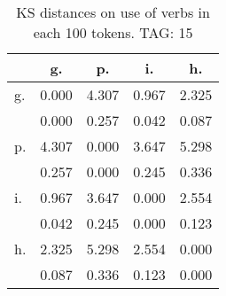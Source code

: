 \begin{table}[h!]
\begin{center}
\begin{tabular}{| l | c | c | c | c |}\hline
 & g. & p. & i. & h. \\\hline
g. & 0.000  & 4.307  & 0.967  & 2.325 \\\hline
 & 0.000  & 0.257  & 0.042  & 0.087 \\\hline
p. & 4.307  & 0.000  & 3.647  & 5.298 \\\hline
 & 0.257  & 0.000  & 0.245  & 0.336 \\\hline
i. & 0.967  & 3.647  & 0.000  & 2.554 \\\hline
 & 0.042  & 0.245  & 0.000  & 0.123 \\\hline
h. & 2.325  & 5.298  & 2.554  & 0.000 \\\hline
 & 0.087  & 0.336  & 0.123  & 0.000 \\\hline
\end{tabular}
\caption{KS distances on use of verbs in each 100 tokens. TAG: 15}
\end{center}
\end{table}